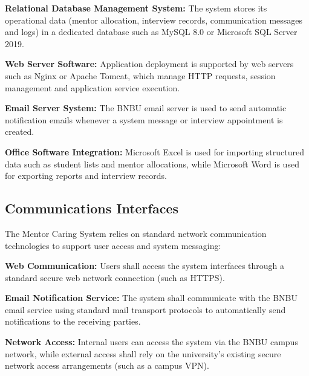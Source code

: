 \textbf{Relational Database Management System:} The system stores its operational data (mentor allocation, interview records, communication messages and logs) in a dedicated database such as MySQL 8.0 or Microsoft SQL Server 2019.

\textbf{Web Server Software:} Application deployment is supported by web servers such as Nginx or Apache Tomcat, which manage HTTP requests, session management and application service execution.

\textbf{Email Server System:} The BNBU email server is used to send automatic notification emails whenever a system message or interview appointment is created.

\textbf{Office Software Integration:} Microsoft Excel is used for importing structured data such as student lists and mentor allocations, while Microsoft Word is used for exporting reports and interview records.

\subsection{Communications Interfaces}

The Mentor Caring System relies on standard network communication technologies to support user access and system messaging:

\textbf{Web Communication:} Users shall access the system interfaces through a standard secure web network connection (such as HTTPS).

\textbf{Email Notification Service:} The system shall communicate with the BNBU email service using standard mail transport protocols to automatically send notifications to the receiving parties.

\textbf{Network Access:} Internal users can access the system via the BNBU campus network, while external access shall rely on the university's existing secure network access arrangements (such as a campus VPN).
